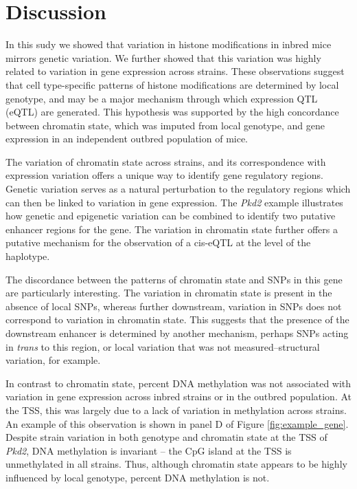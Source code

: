\documentclass[10pt,letterpaper]{article}
\begin{document}
\hypertarget{discussion}{%
\section{Discussion}\label{discussion}}

In this sudy we showed that variation in histone modifications in inbred
mice mirrors genetic variation. We further showed that this variation
was highly related to variation in gene expression across strains. These
observations suggest that cell type-specific patterns of histone
modifications are determined by local genotype, and may be a major
mechanism through which expression QTL (eQTL) are generated. This
hypothesis was supported by the high concordance between chromatin
state, which was imputed from local genotype, and gene expression in an
independent outbred population of mice.

The variation of chromatin state across strains, and its correspondence
with expression variation offers a unique way to identify gene
regulatory regions. Genetic variation serves as a natural perturbation
to the regulatory regions which can then be linked to variation in gene
expression. The \textit{Pkd2} example illustrates how genetic and
epigenetic variation can be combined to identify two putative enhancer
regions for the gene. The variation in chromatin state further offers a
putative mechanism for the observation of a cis-eQTL at the level of the
haplotype.

The discordance between the patterns of chromatin state and SNPs in this
gene are particularly interesting. The variation in chromatin state is
present in the absence of local SNPs, whereas further downstream,
variation in SNPs does not correspond to variation in chromatin state.
This suggests that the presence of the downstream enhancer is determined
by another mechanism, perhaps SNPs acting in \textit{trans} to this
region, or local variation that was not measured--structural variation,
for example.

In contrast to chromatin state, percent DNA methylation was not
associated with variation in gene expression across inbred strains or in
the outbred population. At the TSS, this was largely due to a lack of
variation in methylation across strains. An example of this observation
is shown in panel D of Figure \ref{fig:example_gene}. Despite strain
variation in both genotype and chromatin state at the TSS of
\textit{Pkd2}, DNA methylation is invariant -- the CpG island at the TSS
is unmethylated in all strains. Thus, although chromatin state appears
to be highly influenced by local genotype, percent DNA methylation is
not.
\end{document}
